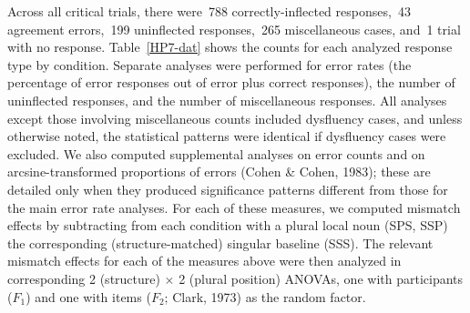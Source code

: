 \documentclass[12pt,titlepage]{article}
\newcommand{\NOTE}[1]{\textbf{*** #1 ***}}  %
\newcommand{\IGNORE}[1]{} %
\begin{document}
Across all critical trials, there were~788 correctly-inflected
responses,~43 agreement errors,~199 uninflected responses,~265
miscellaneous cases, and~1 trial with no response.  Table~\ref{HP7-dat}
shows the counts for each analyzed response type by condition.  Separate
analyses were performed for error rates (the percentage of error responses
out of error plus correct responses), the number of uninflected responses,
and the number of miscellaneous responses.  All analyses except those
involving miscellaneous counts included dysfluency cases, and unless
otherwise noted, the statistical patterns were identical if dysfluency
cases were excluded.  We also computed supplemental analyses on error
counts and on arcsine-transformed proportions of errors (Cohen \& Cohen,
1983); these are detailed only when they produced significance patterns
different from those for the main error rate analyses.  For each of these
measures, we computed mismatch effects by subtracting from each condition
with a plural local noun (SPS, SSP) the corresponding (structure-matched)
singular baseline (SSS)\@.  The relevant mismatch effects for each of the
measures above were then analyzed in corresponding 2 (structure) $\times$ 2
(plural position) ANOVAs, one with participants ($F_{1}$) and one with
items ($F_{2}$; Clark, 1973) as the random factor.\IGNORE{\NOTE{covered in
fn in Method section} In all analyses, effects reported as reliable were
significant at or beyond the .05 level\IGNORE{ unless otherwise
noted}.}\IGNORE{

old stuff describing overall ANOVAs:

For each of these measures, we performed two overall 2 (structure) $\times$
3 (local noun number) ANOVAs, one with participants ($F_{1}$) and one with
items ($F_{2}$; Clark, 1973) as the random factor.  However, all
theoretical predictions specifically concern mismatch effects, so we
calculated these for each mismatch condition (SPS, SSP) by subtracting out
its corresponding (structure-matched) singular baseline (SSS)\@.  The
relevant mismatch effects for each of the measures above were then analyzed
in corresponding 2 (structure) $\times$ 2 (plural position)
ANOVAs.\IGNORE{\NOTE{covered in fn in Method section} In all analyses,
effects reported as reliable were significant at or beyond the .05
level\IGNORE{ unless otherwise noted}.}

}
\end{document}
